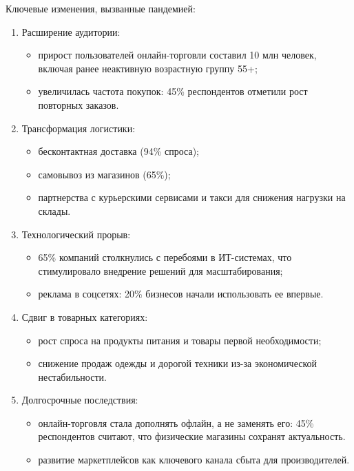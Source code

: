 Ключевые изменения, вызванные пандемией:
\begin{enumerate}
	\item Расширение аудитории:
	\begin{itemize}
		\item прирост пользователей онлайн-торговли составил 10 млн человек, включая ранее неактивную возрастную группу 55+;
		\item увеличилась частота покупок: 45\% респондентов отметили рост повторных заказов.
	\end{itemize}
	
	\item Трансформация логистики:
	\begin{itemize}
		\item бесконтактная доставка (94\% спроса);
		\item самовывоз из магазинов (65\%);
		\item партнерства с курьерскими сервисами и такси для снижения нагрузки на склады.
	\end{itemize}
	
	\item Технологический прорыв:
	\begin{itemize}
		\item 65\% компаний столкнулись с перебоями в ИТ-системах, что стимулировало внедрение решений для масштабирования;
		\item реклама в соцсетях: 20\% бизнесов начали использовать ее впервые.
	\end{itemize}
	
	\item Сдвиг в товарных категориях:
	\begin{itemize}
		\item рост спроса на продукты питания и товары первой необходимости;
		\item снижение продаж одежды и дорогой техники из-за экономической нестабильности.
	\end{itemize}
	
	\item Долгосрочные последствия:
	\begin{itemize}
		\item онлайн-торговля стала дополнять офлайн, а не заменять его: 45\% респондентов считают, что физические магазины сохранят актуальность.
		\item развитие маркетплейсов как ключевого канала сбыта для производителей.
	\end{itemize}
	
\end{enumerate}

